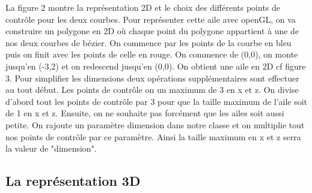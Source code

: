 \documentclass{article}
\begin{document}
La figure 2 montre la représentation 2D et le choix des différents points de contrôle pour les deux courbes. Pour représenter cette aile avec openGL, on va construire un polygone en 2D où chaque point du polygone appartient à une de nos deux courbes de bézier. On commence par les points de la courbe en bleu puis on finit avec les points de celle en rouge. On commence de (0,0), on monte jusqu'en (-3,2) et on redescend jusqu'en (0,0). On obtient une aile en 2D cf figure 3. 
\newline
\newline
Pour simplifier les dimensions deux opérations supplémentaires sont effectuer au tout début. Les points de contrôle on un maximum de 3 en x et z. On divise d'abord tout les points de contrôle par 3 pour que la taille maximum de l'aile soit de 1 en x et z. Ensuite, on ne souhaite pas forcément que les ailes soit aussi petite. On rajoute un paramètre dimension dans notre classe et on multiplie tout nos points de contrôle par ce paramètre. Ainsi la taille maximum en x et z serra la valeur de "dimension".

\subsection{La représentation 3D}
\end{document}
